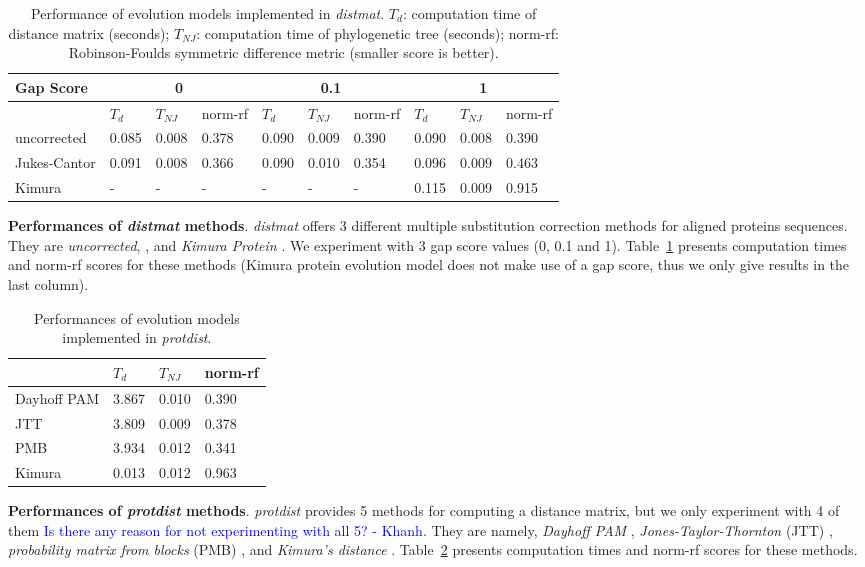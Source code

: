\documentclass[11pt,letterpaper]{article}
\newcommand\kcomment[1]{\textcolor{blue}{#1 - Khanh}}
\theoremstyle{definition}
\begin{document}
\begin{table}[h]
\centering
	\begin{tabular}{l|lll|lll|lll}
Gap Score	& \multicolumn{3}{c}{0} & \multicolumn{3}{c}{0.1} &  \multicolumn{3}{c}{1} \\
\hline
&	$T_d$	& $T_{NJ}$	& norm-rf &	$T_d$	& $T_{NJ}$	& norm-rf &	$T_d$	& $T_{NJ}$	& norm-rf \\
\hline
uncorrected		&	0.085	&	0.008	&	0.378	&	0.090	&	0.009	&	0.390	&	0.090	&	0.008	&	0.390	\\
Jukes-Cantor	&	0.091	&	0.008	&	0.366	&	0.090	&	0.010	&	0.354	&	0.096	&	0.009	&	0.463	\\
Kimura 	&	-	&	-	&	-	&	-	&	-	&	-	&	0.115	&	0.009	&	0.915	\\
\hline
\end{tabular}
\caption{Performance of evolution models implemented in \textit{distmat}. $T_d$: computation time of distance matrix (seconds); $T_{NJ}$: computation time of phylogenetic tree (seconds); norm-rf: Robinson-Foulds symmetric difference metric (smaller score is better).
}\label{tab:dist1}
\end{table}

\textbf{Performances of \textit{distmat} methods}. \textit{distmat} offers 3 different multiple substitution correction methods for aligned proteins sequences. They are \textit{uncorrected},  \cite{jukes1969evolution}, and \textit{Kimura Protein} \cite{kimura1980simple}. We experiment with 3 gap score values (0, 0.1 and 1). Table~\ref{tab:dist1} presents computation times and norm-rf scores for these methods (Kimura protein evolution model does not make use of a gap score, thus we only give results in the last column).

\begin{table}[h]
\centering
	\begin{tabular}{l|lll}
	\hline
	&	$T_d$	& $T_{NJ}$	& norm-rf  \\
	\hline
	Dayhoff PAM	&	3.867	&	0.010	&	0.390	\\
	JTT			&	3.809	&	0.009	&	0.378	\\
	PMB			&	3.934	&	0.012	&	0.341	\\
	Kimura		&	0.013	&	0.012	&	0.963	\\
	\hline
	\end{tabular}
\caption{Performances of evolution models implemented in \textit{protdist}.}\label{tab:dist2}
\end{table}

\textbf{Performances of \textit{protdist} methods}. \textit{protdist} provides 5 methods for computing a distance matrix, but we only experiment with 4 of them \kcomment{Is there any reason for not experimenting with all 5?}. They are namely, \textit{Dayhoff PAM} \cite{kosiol2005different}, \textit{Jones-Taylor-Thornton} (JTT) \cite{jones1992rapid}, \textit{probability matrix from blocks} (PMB) \cite{veerassamy2003transition}, and \textit{Kimura's distance} \cite{kimura1983rare}. Table~\ref{tab:dist2} presents computation times and norm-rf scores for these methods.
\end{document}
